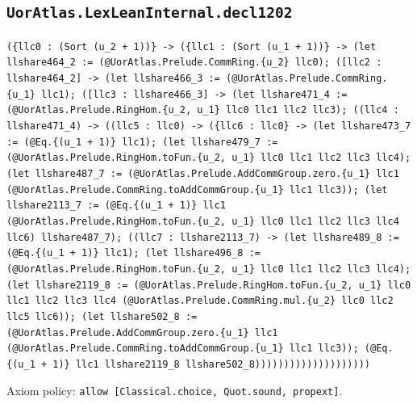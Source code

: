 \documentclass[11pt]{article}
\begin{document}
\subsection*{\texttt{UorAtlas.LexLeanInternal.decl1202}}
\noindent\texttt{(\{llc0 : (Sort (u\_2 + 1))\} -> (\{llc1 : (Sort (u\_1 + 1))\} -> (let llshare464\_2 := (@UorAtlas.Prelude.CommRing.\{u\_2\} llc0); ([llc2 : llshare464\_2] -> (let llshare466\_3 := (@UorAtlas.Prelude.CommRing.\{u\_1\} llc1); ([llc3 : llshare466\_3] -> (let llshare471\_4 := (@UorAtlas.Prelude.RingHom.\{u\_2, u\_1\} llc0 llc1 llc2 llc3); ((llc4 : llshare471\_4) -> ((llc5 : llc0) -> (\{llc6 : llc0\} -> (let llshare473\_7 := (@Eq.\{(u\_1 + 1)\} llc1); (let llshare479\_7 := (@UorAtlas.Prelude.RingHom.toFun.\{u\_2, u\_1\} llc0 llc1 llc2 llc3 llc4); (let llshare487\_7 := (@UorAtlas.Prelude.AddCommGroup.zero.\{u\_1\} llc1 (@UorAtlas.Prelude.CommRing.toAddCommGroup.\{u\_1\} llc1 llc3)); (let llshare2113\_7 := (@Eq.\{(u\_1 + 1)\} llc1 (@UorAtlas.Prelude.RingHom.toFun.\{u\_2, u\_1\} llc0 llc1 llc2 llc3 llc4 llc6) llshare487\_7); ((llc7 : llshare2113\_7) -> (let llshare489\_8 := (@Eq.\{(u\_1 + 1)\} llc1); (let llshare496\_8 := (@UorAtlas.Prelude.RingHom.toFun.\{u\_2, u\_1\} llc0 llc1 llc2 llc3 llc4); (let llshare2119\_8 := (@UorAtlas.Prelude.RingHom.toFun.\{u\_2, u\_1\} llc0 llc1 llc2 llc3 llc4 (@UorAtlas.Prelude.CommRing.mul.\{u\_2\} llc0 llc2 llc5 llc6)); (let llshare502\_8 := (@UorAtlas.Prelude.AddCommGroup.zero.\{u\_1\} llc1 (@UorAtlas.Prelude.CommRing.toAddCommGroup.\{u\_1\} llc1 llc3)); (@Eq.\{(u\_1 + 1)\} llc1 llshare2119\_8 llshare502\_8))))))))))))))))))))}\par
\noindent Axiom policy: \texttt{allow [Classical.choice, Quot.sound, propext]}.\par
\end{document}
